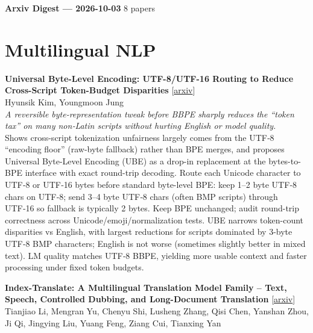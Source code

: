 \documentclass[12pt,letterpaper]{article}
\begin{document}
{\footnotesize\textbf{Arxiv Digest --- 2026-10-03} \hfill 8 papers}

\smallskip

\section*{Multilingual NLP}

{\small\textbf{Universal Byte-Level Encoding: UTF-8/UTF-16 Routing to Reduce Cross-Script Token-Budget Disparities}} {\scriptsize[\href{https://arxiv.org/abs/2610.01984}{arxiv}]}\\
{\scriptsize Hyunsik Kim, Youngmoon Jung}\\

{\small\textit{A reversible byte-representation tweak before BBPE sharply reduces the ``token tax'' on many non‑Latin scripts without hurting English or model quality.}}\\[1pt]
{\footnotesize Shows cross-script tokenization unfairness largely comes from the UTF‑8 ``encoding floor'' (raw-byte fallback) rather than BPE merges, and proposes Universal Byte-Level Encoding (UBE) as a drop-in replacement at the bytes-to-BPE interface with exact round-trip decoding. Route each Unicode character to UTF‑8 or UTF‑16 bytes before standard byte-level BPE: keep 1--2 byte UTF‑8 chars on UTF‑8; send 3--4 byte UTF‑8 chars (often BMP scripts) through UTF‑16 so fallback is typically 2 bytes. Keep BPE unchanged; audit round-trip correctness across Unicode/emoji/normalization tests. UBE narrows token-count disparities vs English, with largest reductions for scripts dominated by 3-byte UTF‑8 BMP characters; English is not worse (sometimes slightly better in mixed text). LM quality matches UTF‑8 BBPE, yielding more usable context and faster processing under fixed token budgets.}

\medskip

{\small\textbf{Index-Translate: A Multilingual Translation Model Family -- Text, Speech, Controlled Dubbing, and Long-Document Translation}} {\scriptsize[\href{https://arxiv.org/abs/2609.40181}{arxiv}]}\\
{\scriptsize Tianjiao Li, Mengran Yu, Chenyu Shi, Lusheng Zhang, Qisi Chen, Yanshan Zhou, Ji Qi, Jingying Liu, Yuang Feng, Ziang Cui, Tianxing Yan}\\
\end{document}
